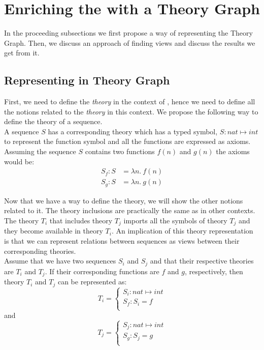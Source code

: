   \section{Enriching the \oeis with a Theory Graph} \label{sec:Enrich}

In the proceeding subsections we first propose a way of representing the \oeis Theory Graph. Then, we discuss an
approach of finding views and discuss the results we get from it.

\subsection{Representing \oeis in Theory Graph} \label{sec:Representation}

First, we need to define the \emph{theory} in the context of \oeis, hence we need to define all the notions related
to the \emph{theory} in this context. We propose the following way to define the theory of a sequence.\\
A sequence $S$ has a corresponding theory which has a typed symbol, $S : nat \mapsto int$ to represent the function
symbol and all the functions are expressed as axioms. Assuming the sequence $S$ contains two functions $f(n)$ and $g
(n)$ the axioms would be:
\begin{equation}
\begin{split}
S_{f}: S &= \lambda n. \ f(n) \\
S_{g}: S &= \lambda n. \ g(n)
\end{split}
\end{equation}


Now that we have a way to define the theory, we will show  the other notions related to it. The theory inclusions are
 practically the same as in other contexts. The theory $T_i$ that includes theory $T_j$ imports all the symbols of
 theory $T_j$ and they become available in theory $T_i$. An implication of this theory representation is that we can
 represent relations between sequences as views between their corresponding theories.\\
Assume that we have two sequences $S_i$ and $S_j$ and that their respective theories are $T_i$ and $T_j$. If their
corresponding functions are $f$ and $g$, respectively, then theory $T_i$ and $T_j$ can be represented as:\\

\[ T_i = \begin{cases} S_i : nat \mapsto int \\ S_{f} : S_i = f   \\
\end{cases} \]  and
\[ T_j = \begin{cases} S_j : nat \mapsto int \\ S_{g} : S_j = g   \\
\end{cases} \]


